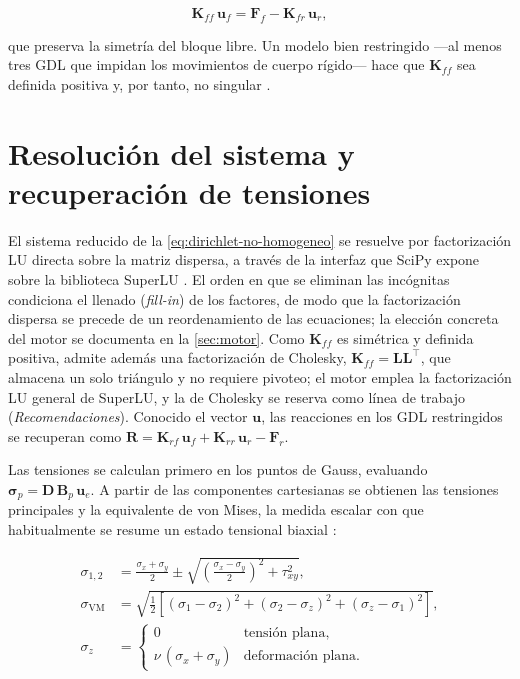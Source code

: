 \begin{equation}
\bm{K}_{ff}\,\bm{u}_f = \bm{F}_f - \bm{K}_{fr}\,\bm{u}_r,
\label{eq:dirichlet-no-homogeneo}
\end{equation}

que preserva la simetría del bloque libre. Un modelo bien restringido —al menos tres GDL que impidan los movimientos de cuerpo rígido— hace que $\bm{K}_{ff}$ sea definida positiva y, por tanto, no singular \autocite[pp.~726-727]{bathe2014fem}.

\section{Resolución del sistema y recuperación de tensiones}
\label{sec:resolucion-tensiones}

El sistema reducido de la \autoref{eq:dirichlet-no-homogeneo} se resuelve por factorización LU directa sobre la matriz dispersa, a través de la interfaz que SciPy expone sobre la biblioteca SuperLU \autocite[p.~264]{virtanen2020scipy}. El orden en que se eliminan las incógnitas condiciona el llenado (\emph{fill-in}) de los factores, de modo que la factorización dispersa se precede de un reordenamiento de las ecuaciones; la elección concreta del motor se documenta en la \autoref{sec:motor}. Como $\bm{K}_{ff}$ es simétrica y definida positiva, admite además una factorización de Cholesky, $\bm{K}_{ff} = \bm{L}\bm{L}^{\top}$, que almacena un solo triángulo y no requiere pivoteo; el motor emplea la factorización LU general de SuperLU, y la de Cholesky se reserva como línea de trabajo (\emph{Recomendaciones}). Conocido el vector $\bm{u}$, las reacciones en los GDL restringidos se recuperan como $\bm{R} = \bm{K}_{rf}\,\bm{u}_f + \bm{K}_{rr}\,\bm{u}_r - \bm{F}_r$.

Las tensiones se calculan primero en los puntos de Gauss, evaluando $\bm{\sigma}_p = \bm{D}\,\bm{B}_p\,\bm{u}_e$. A partir de las componentes cartesianas se obtienen las tensiones principales \autocite[pp.~12-14]{timoshenko1970elasticity} y la equivalente de von Mises, la medida escalar con que habitualmente se resume un estado tensional biaxial \autocite[p.~117]{cook2002concepts}:

\begin{equation}
\begin{aligned}
\sigma_{1,2} &= \frac{\sigma_x + \sigma_y}{2} \pm \sqrt{\left(\frac{\sigma_x - \sigma_y}{2}\right)^2 + \tau_{xy}^2}, \\
\sigma_{\mathrm{VM}} &= \sqrt{\tfrac{1}{2}\left[(\sigma_1-\sigma_2)^2 + (\sigma_2-\sigma_z)^2 + (\sigma_z-\sigma_1)^2\right]}, \\
\sigma_z &=
\begin{cases}
0 & \text{tensión plana,}\\
\nu\,(\sigma_x+\sigma_y) & \text{deformación plana.}
\end{cases}
\end{aligned}
\label{eq:principales-vm}
\end{equation}

